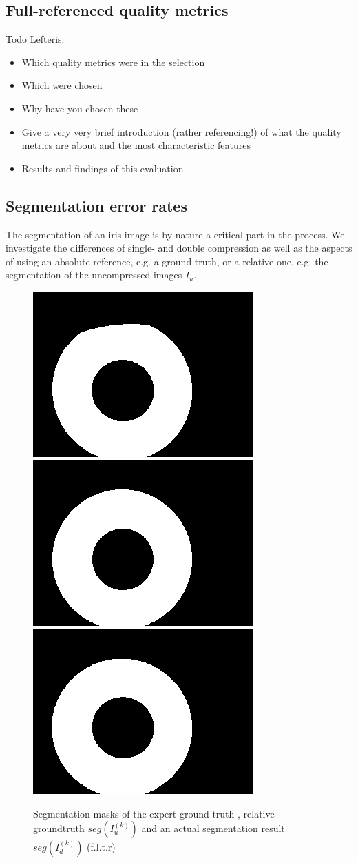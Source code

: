\documentclass[10pt,twocolumn,letterpaper]{article}
\begin{document}
\subsection{Full-referenced quality metrics}
Todo Lefteris:
\begin{itemize}
 \item Which quality metrics were in the selection
 \item Which were chosen
 \item Why have you chosen these
 \item Give a very very brief introduction (rather referencing!) of what the quality metrics are about and the most characteristic features
 \item Results and findings of this evaluation
\end{itemize}

\subsection{Segmentation error rates}
\label{section:ser}
The segmentation of an iris image is by nature a critical part in the process. We investigate the differences of single- and double compression as well as the aspects of using an absolute reference, e.g. a ground truth, or a relative one, e.g. the segmentation of the uncompressed images $I_u$.

\begin{figure}
\begin{center}

  \includegraphics[width=0.3\linewidth]{img/segMasks/gt.png}
  \includegraphics[width=0.3\linewidth]{img/segMasks/jpg_caht_q100_cr5.png}
  \includegraphics[width=0.3\linewidth]{img/segMasks/jpg_wahet_q100_cr5.png}
  \end{center}
  
  \label{fig:segMasks}
  \caption{Segmentation masks of the expert ground truth \cite{severeCompression}, relative groundtruth $seg(I_u^{(k)})$ and an actual segmentation result $seg(I_d^{(k)})$ (f.l.t.r)}
\end{figure}
\end{document}
